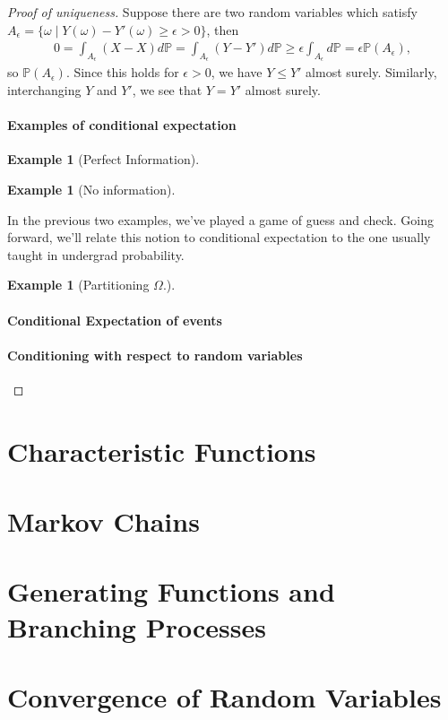 \documentclass[12pt]{article}
\newcommand{\Prob}{\mathbb{P}}
\theoremstyle{definition}
\newtheorem{exmp}[thm]{Example}
\theoremstyle{remark}
\numberwithin{equation}{section}
\begin{document}
\begin{proof}[Proof of uniqueness]
  Suppose there are two random variables which satisfy $A_\epsilon = \{\omega \mid Y(\omega)-Y'(\omega)\geq \epsilon > 0 \}$, then 
  \begin{align}
    0 = \int_{A_\epsilon} (X - X)d\Prob = \int_{A_\epsilon} (Y - Y')d\Prob \geq \epsilon \int_{A_\epsilon}d\Prob = \epsilon \Prob(A_\epsilon),
  \end{align}
  so $\Prob(A_\epsilon)$. Since this holds for $\epsilon >0$, we have $Y\leq Y'$ almost surely. Similarly, interchanging $Y$ and $Y'$, we see that $Y = Y'$ almost surely.

  \paragraph{Examples of conditional expectation}%
  \label{par:examples_of_conditional_expectation}
 
  \begin{exmp}[Perfect Information]
  \end{exmp}

  \begin{exmp}[No information]
  \end{exmp}

  In the previous two examples, we've played a game of guess and check. Going forward, we'll relate this notion to conditional expectation to the one usually taught in undergrad probability.

  \begin{exmp}[Partitioning $\Omega$.]
  \end{exmp}

  \paragraph{Conditional Expectation of events}%
  \label{par:conditional_expectation_of_events}
  
\paragraph{Conditioning with respect to random variables}%
\label{par:conditioning_with_respect_to_random_variables}


  
\end{proof}
  \section{Characteristic Functions}%
  \label{sec:characteristic_functions}
  
  \section{Markov Chains}%
  \label{sec:markov_chains}
  
  \section{Generating Functions and Branching Processes}%
  \label{sec:generating_functions_and_branching_processes}
  
  \section{Convergence of Random Variables}%
  \label{sec:convergence_of_random_variables} 
\end{document}

